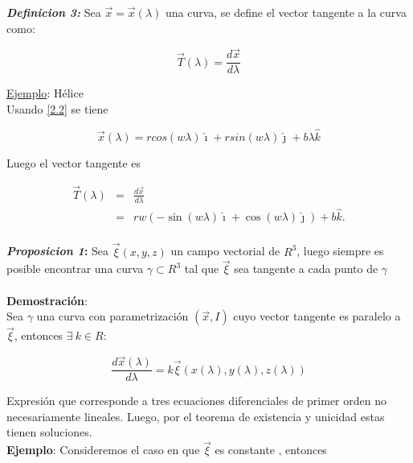 \documentclass[12pt]{report}
\begin{document}
\textbf{\textit{Definicion 3:}} Sea $\vec{x} = \vec{x}(\lambda)$ una curva, se define el vector tangente a la curva como:

\begin{equation} \label{2.3}
\Vec{T}(\lambda)= \frac{d \vec{x} }{ d\lambda }  %
\end{equation}

\underline{Ejemplo}: Hélice
\\

Usando \eqref{2.2} se tiene 

\begin{equation}\label{2.4}
\displaystyle \vec{x}(\lambda)= rcos(w\lambda) \hat{\imath} +  rsin(w\lambda) \hat{\jmath} +b\lambda \hat{k}
\end{equation}

Luego el vector tangente es 

\begin{eqnarray} \nonumber
\vec{T}(\lambda) &=& \frac{d\vec{x}}{d\lambda} \\ \nonumber
&=& rw \left( -\sin (w\lambda)\hat{\imath} + \cos(w\lambda)\hat{\jmath} \right) + b\hat{k}.
\end{eqnarray} \\







\textbf{\textit{Proposicion 1}:} Sea $\vec{\xi}(x,y,z)$ un campo vectorial de $R^3$, luego siempre es posible encontrar una curva $\gamma \subset R^3$ tal que $\vec{\xi}$ sea tangente a cada punto de $\gamma$\\
\\
\textbf{Demostración}: 
\\

Sea $\gamma$ una curva  con parametrización $(\vec{x},I)$ cuyo vector tangente es paralelo a $\vec{\xi}$, entonces $\exists \ k \in R : $   

\begin{equation} \nonumber
\frac{d\vec{x}(\lambda)}{d\lambda}=k \vec{\xi}\left(x(\lambda),y(\lambda),z(\lambda)\right)
\end{equation}

Expresión que corresponde a tres ecuaciones diferenciales de primer orden no necesariamente lineales. Luego, por el teorema de existencia y unicidad estas tienen soluciones. \\

\textbf{Ejemplo}: Consideremos el caso en que $\vec{\xi}$ es constante , entonces 
\end{document}
